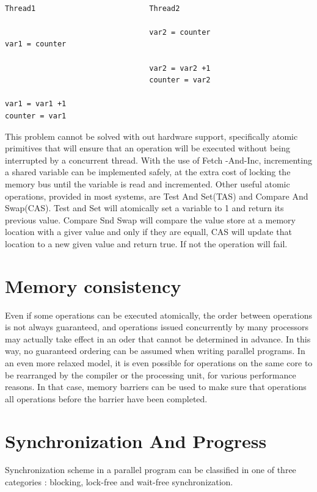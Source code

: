\begin{lstlisting}
	
Thread1                          Thread2

                                 var2 = counter
var1 = counter	

                                 var2 = var2 +1
                                 counter = var2

var1 = var1 +1
counter = var1

\end{lstlisting}

This problem cannot be solved with out hardware support, specifically atomic primitives that will ensure that an operation will be executed without being interrupted by a concurrent thread.  With the use of Fetch -And-Inc, incrementing a shared variable can be implemented safely, at the extra cost of locking  the memory bus until the variable is read and incremented. Other useful atomic operations, provided in most systems, are Test And Set(TAS) and Compare And Swap(CAS). Test and Set will atomically set a variable to 1 and return its previous value. Compare Snd Swap will compare the value store at a memory location with a giver value and only if they are equall, CAS will update that location to a new given value and return true. If not the operation will fail.

\section{Memory consistency}

Even if some operations can be executed atomically, the order between operations is not always guaranteed, and operations issued concurrently by many processors may actually take effect in an oder that cannot be determined in advance. In this way, no guaranteed ordering can be assumed when writing parallel programs. In an even more relaxed model, it is even possible for operations on the same core to be rearranged by the compiler or the processing unit, for various performance reasons. In that case, memory barriers can be used to make sure that operations all operations before the barrier have been completed.
\section{Synchronization And Progress}

Synchronization scheme in a parallel program  can be classified in one of three categories : blocking, lock-free and wait-free synchronization.

